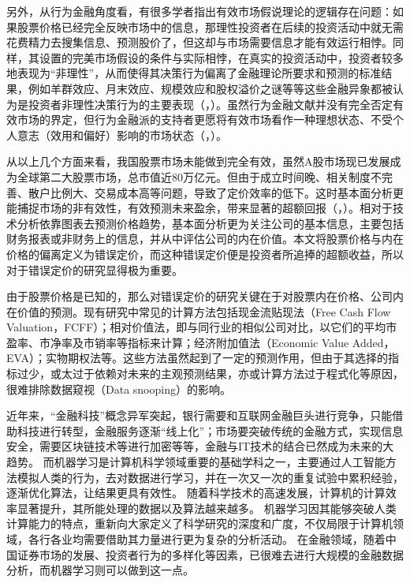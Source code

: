 另外，从行为金融角度看，有很多学者指出有效市场假说理论的逻辑存在问题：如果股票价格已经完全反映市场中的信息，那理性投资者在后续的投资活动中就无需花费精力去搜集信息、预测股价了，但这却与市场需要信息才能有效运行相悖。同样，其设置的完美市场假设的条件与实际相悖，在真实的投资活动中，投资者较多地表现为“非理性”，从而使得其决策行为偏离了金融理论所要求和预测的标准结果，例如羊群效应、月末效应、规模效应和股权溢价之谜等等这些金融异象都被认为是投资者非理性决策行为的主要表现（\citeauthor{zhangTouZiZheZhenDeShiLiXingDeMaXingWeiJinRongXueDuiFaMaDeShiChangYouXiaoJiaShuo2015e}，\citeyear{zhangTouZiZheZhenDeShiLiXingDeMaXingWeiJinRongXueDuiFaMaDeShiChangYouXiaoJiaShuo2015e}）。虽然行为金融文献并没有完全否定有效市场的界定，但行为金融派的支持者更愿将有效市场看作一种理想状态、不受个人意志（效用和偏好）影响的市场状态（\citeauthor{dingYouXiaoShiChangDeJianYanXingWeiJinRongDuiEMHLiLunDePiPan2017}，\citeyear{dingYouXiaoShiChangDeJianYanXingWeiJinRongDuiEMHLiLunDePiPan2017}）。

从以上几个方面来看，我国股票市场未能做到完全有效，虽然A股市场现已发展成为全球第二大股票市场，总市值近80万亿元。但由于成立时间晚、相关制度不完善、散户比例大、交易成本高等问题，导致了定价效率的低下。这时基本面分析更能捕捉市场的非有效性，有效预测未来盈余，带来显著的超额回报（\citeauthor{wangJiBenMianFenXiZaiZhongGuoAGuShiChangYouYongMaLaiZiJiDuCaiWuBaoBiaoDeZhengJu2018}，\citeyear{wangJiBenMianFenXiZaiZhongGuoAGuShiChangYouYongMaLaiZiJiDuCaiWuBaoBiaoDeZhengJu2018}）。相对于技术分析依靠图表去预测价格趋势，基本面分析更为关注公司的基本信息，主要包括财务报表或非财务上的信息，并从中评估公司的内在价值。本文将股票价格与内在价格的偏离定义为错误定价，而这种错误定价便是投资者所追捧的超额收益，所以对于错误定价的研究显得极为重要。

由于股票价格是已知的，那么对错误定价的研究关键在于对股票内在价格、公司内在价值的预测。现有研究中常见的计算方法包括现金流贴现法（Free Cash Flow Valuation，FCFF）；相对价值法，即与同行业的相似公司对比，以它们的平均市盈率、市净率及市销率等指标来计算；经济附加值法（Economic Value Added，EVA）；实物期权法等。这些方法虽然起到了一定的预测作用，但由于其选择的指标过少，或太过于依赖对未来的主观预测结果，亦或计算方法过于程式化等原因，很难排除数据窥视（Data snooping）的影响。

近年来，“金融科技”概念异军突起，银行需要和互联网金融巨头进行竞争，只能借助科技进行转型，金融服务逐渐“线上化”；市场要突破传统的金融方式，实现信息安全，需要区块链技术等进行加密等等，金融与IT技术的结合已然成为未来的大趋势。
而机器学习是计算机科学领域重要的基础学科之一，主要通过人工智能方法模拟人类的行为，去对数据进行学习，并在一次又一次的重复试验中累积经验，逐渐优化算法，让结果更具有效性。
随着科学技术的高速发展，计算机的计算效率显著提升，其所能处理的数据以及算法越来越多。
机器学习因其能够突破人类计算能力的特点，重新向大家定义了科学研究的深度和广度，不仅局限于计算机领域，各行各业均需要借助其力量进行更为复杂的分析活动。
在金融领域，随着中国证券市场的发展、投资者行为的多样化等因素，已很难去进行大规模的金融数据分析，而机器学习则可以做到这一点。

